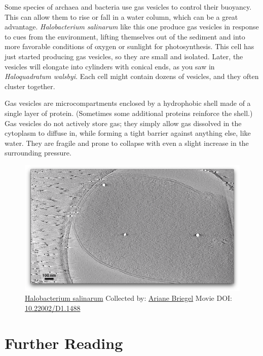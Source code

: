 \documentclass[]{tufte-book}
\begin{document}
Some species of archaea and bacteria use gas vesicles to control their
buoyancy. This can allow them to rise or fall in a water column, which
can be a great advantage. \emph{Halobacterium salinarum} like this one
produce gas vesicles in response to cues from the environment, lifting
themselves out of the sediment and into more favorable conditions of
oxygen or sunlight for photosynthesis. This cell has just started
producing gas vesicles, so they are small and isolated. Later, the
vesicles will elongate into cylinders with conical ends, as you saw in
\emph{Haloquadratum walsbyi}. Each cell might contain dozens of
vesicles, and they often cluster together.

Gas vesicles are microcompartments enclosed by a hydrophobic shell made
of a single layer of protein. (Sometimes some additional proteins
reinforce the shell.) Gas vesicles do not actively store gas; they
simply allow gas dissolved in the cytoplasm to diffuse in, while forming
a tight barrier against anything else, like water. They are fragile and
prone to collapse with even a slight increase in the surrounding
pressure.





\begin{figure}
\includegraphics{movie_stills/3_7a} \caption[\protect\hyperlink{tree}{Halobacterium salinarum} Collected
by: \protect\hyperlink{ariane_briegel}{Ariane Briegel} Movie DOI:
\href{https://doi.org/10.22002/D1.1488}{10.22002/D1.1488}]{\protect\hyperlink{tree}{Halobacterium salinarum} Collected
by: \protect\hyperlink{ariane_briegel}{Ariane Briegel} Movie DOI:
\href{https://doi.org/10.22002/D1.1488}{10.22002/D1.1488}}\label{fig:3-7a}
\end{figure}

\section{Further Reading}\label{further-reading}
\end{document}
